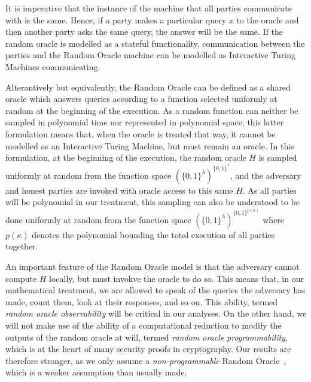 It is imperative that the instance of the machine that all parties communicate
with is the same. Hence, if a party makes a particular query $x$ to the oracle
and then another party asks the same query, the answer will be the same. If the
random oracle is modelled as a stateful functionality, communication between the
parties and the Random Oracle machine can be modelled as Interactive Turing
Machines communicating.

Alterantively but equivalently, the Random Oracle can be defined as a shared
oracle which answers queries according to a function selected uniformly at
random at the beginning of the execution. As a random function can neither be
sampled in polynomial time nor represented in polynomial space, this latter
formulation means that, when the oracle is treated that way, it cannot be
modelled as an Interactive Turing Machine, but must remain an oracle. In this
formulation, at the beginning of the execution, the random oracle $H$ is sampled
uniformly at random from the function space $(\{0, 1\}^\lambda)^{\{0, 1\}^*}$,
and the adversary and honest parties are invoked with oracle access to this same
$H$. As all parties will be polynomial in our treatment, this sampling can also
be understood to be done uniformly at random from the function space $(\{0,
1\}^\lambda)^{\{0, 1\}^{p(\kappa)}}$ where $p(\kappa)$ denotes the polynomial
bounding the total execution of all parties together.

An important feature of the Random Oracle model is that the adversary cannot
compute $H$ locally, but must invokve the oracle to do so. This means that, in
our mathematical treatment, we are allowed to speak of the queries the adversary
has made, count them, look at their responses, and so on. This ability, termed
\emph{random oracle observability} will be critical in our analyses. On the
other hand, we will not make use of the ability of a computational reduction to
modify the outputs of the random oracle at will, termed \emph{random oracle
programmability}, which is at the heart of many security proofs in cryptography.
Our results are therefore stronger, as we only assume a \emph{non-programmable}
Random Oracle~\cite{nielsen2002separating,fischlin2010random}, which is a weaker
assumption than usually made.
